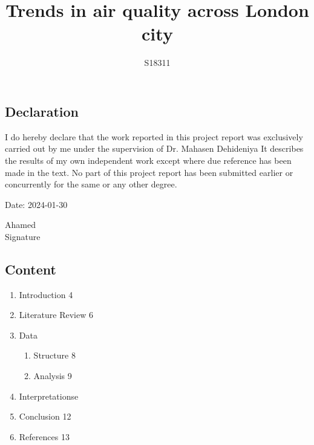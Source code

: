 \documentclass{article}
\title{Trends in air quality across London city}
\author{S18311}
\begin{document}
	\maketitle
	
	
	
	\newpage
	\begin{center}
	\section{Declaration}
	\end{center}
	I do hereby declare that the work reported in this project report was exclusively carried out by me under the supervision of Dr. Mahasen Dehideniya It describes the results of my own independent work except where due reference has been made in the text. No part of this project report has been submitted earlier or concurrently for the same or any other degree.\\
	\begin{flushleft}
		Date: 2024-01-30
	\end{flushleft}
	
	\begin{flushright}  %
			Ahamed\\
			Signature
			
	\end{flushright}  %
	\newpage
	
	
	
	
	\begin{center}
		\section{Content}
	\end{center}
	\begin{enumerate}
		\item Introduction \hspace{10cm} 4
		
		\item Literature Review \hspace{9.1cm} 6
		\item Data
		\begin{enumerate}
			\item Structure \hspace{9.6cm} 8
			\item Analysis \hspace{9.75cm} 9
		\end{enumerate}
		\item Interpretationse
		\item Conclusion \hspace{10cm} 12
		\item References \hspace{10cm} 13
	\end{enumerate}
	\newpage
	
\end{document}
